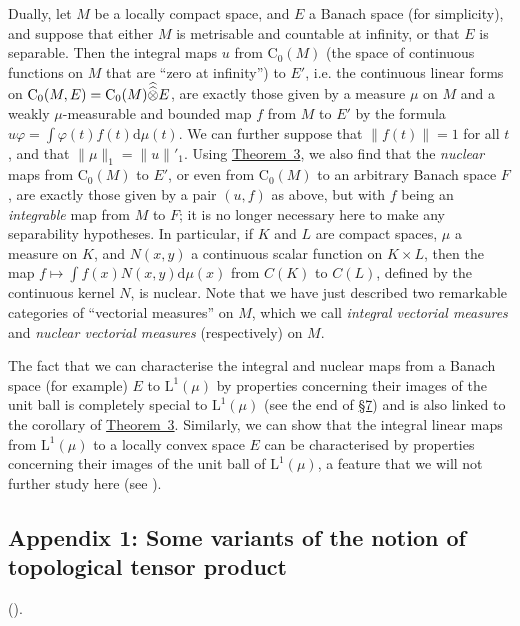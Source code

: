 \documentclass{article}
\theoremstyle{plain}
\newcommand{\LL}{\mathrm{L}}
\newcommand{\CC}{\mathrm{C}}
\newcommand{\hhotimes}{\skew{0}{\widehat}{\skew{0}\widehat{\otimes}}}
\newcommand{\dd}{\mathrm{d}}
\newcommand{\oldpage}[1]{\marginpar{\footnotesize$\Big\vert$ \textit{p.~#1}}}
\begin{document}
{  Dually, let $M$ be a locally compact space, and $E$ a Banach space (for simplicity), and suppose that either $M$ is metrisable and
\oldpage{92}
  countable at infinity, or that $E$ is separable.
  Then the integral maps $u$ from $\CC_0(M)$ (the space of continuous functions on $M$ that are ``zero at infinity'') to $E'$, i.e. the continuous linear forms on $\CC_0(M,E)=\CC_0(M)\hhotimes E$, are exactly those given by a measure $\mu$ on $M$ and a weakly $\mu$-measurable and bounded map $f$ from $M$ to $E'$ by the formula $u\varphi=\int\varphi(t)f(t)\dd\mu(t)$.
  We can further suppose that $\|f(t)\|=1$ for all $t$, and that $\|\mu\|_1=\|u\|'_1$.
  Using \hyperref[1.theorem3]{Theorem~3}, we also find that the \emph{nuclear} maps from $\CC_0(M)$ to $E'$, or even from $\CC_0(M)$ to an arbitrary Banach space $F$, are exactly those given by a pair $(u,f)$ as above, but with $f$ being an \emph{integrable} map from $M$ to $F$;
  it is no longer necessary here to make any separability hypotheses.
  In particular, if $K$ and $L$ are compact spaces, $\mu$ a measure on $K$, and $N(x,y)$ a continuous scalar function on $K\times L$, then the map $f\mapsto\int f(x)N(x,y)\dd\mu(x)$ from $C(K)$ to $C(L)$, defined by the continuous kernel $N$, is nuclear.
  Note that we have just described two remarkable categories of ``vectorial measures'' on $M$, which we call \emph{integral vectorial measures} and \emph{nuclear vectorial measures} (respectively) on $M$.

  The fact that we can characterise the integral and nuclear maps from a Banach space (for example) $E$ to $\LL^1(\mu)$ by properties concerning their images of the unit ball is completely special to $\LL^1(\mu)$ (see the end of \hyperref[1.7]{\S7}) and is also linked to the corollary of \hyperref[1.theorem3]{Theorem~3}.
  Similarly, we can show that the integral linear maps from $\LL^1(\mu)$ to a locally convex space $E$ can be characterised by properties concerning their images of the unit ball of $\LL^1(\mu)$, a feature that we will not further study here (see \cite[chap.~1, \S4, n\textsuperscript{o}~6]{PTT}).
}


\subsection*{Appendix 1: Some variants of the notion of topological tensor product}
\label{appendix1}

(\cite[chap.~1, \S3]{PTT}).
\medskip
\end{document}

